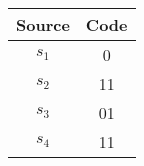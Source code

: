 \documentclass{subfiles}
\begin{document}
    \begin{table*}[!hb]
        \centering
        \begin{tabular}{|c|c|}
            \hline
            \textbf{Source} & \textbf{Code} \\ 
            \hline
            \(s_{1}\) & 0 \\
            \(s_{2}\) & 11 \\
            \(s_{3}\) & 01 \\
            \(s_{4}\) & 11 \\
            \hline
        \end{tabular}
    \end{table*}
\end{document}

